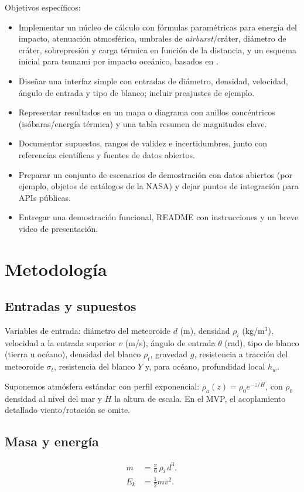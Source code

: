 \documentclass[conference]{IEEEtran}
\begin{document}
Objetivos específicos:
\begin{itemize}
    \item Implementar un núcleo de cálculo con fórmulas paramétricas para energía del impacto, atenuación atmosférica, umbrales de \textit{airburst}/cráter, diámetro de cráter, sobrepresión y carga térmica en función de la distancia, y un esquema inicial para tsunami por impacto oceánico, basados en \cite{collins2005,holsapple1993,wuennemann2010}.
    \item Diseñar una interfaz simple con entradas de diámetro, densidad, velocidad, ángulo de entrada y tipo de blanco; incluir preajustes de ejemplo.
    \item Representar resultados en un mapa o diagrama con anillos concéntricos (isóbaras/energía térmica) y una tabla resumen de magnitudes clave.
    \item Documentar supuestos, rangos de validez e incertidumbres, junto con referencias científicas y fuentes de datos abiertos.
    \item Preparar un conjunto de escenarios de demostración con datos abiertos (por ejemplo, objetos de catálogos de la NASA) y dejar puntos de integración para APIs públicas.
    \item Entregar una demostración funcional, README con instrucciones y un breve video de presentación.
\end{itemize}

\section{Metodología}

\subsection{Entradas y supuestos}
Variables de entrada: diámetro del meteoroide $d$ (m), densidad $\rho_i$ (kg/m$^3$), velocidad a la entrada superior $v$ (m/s), ángulo de entrada $\theta$ (rad), tipo de blanco (tierra u océano), densidad del blanco $\rho_t$, gravedad $g$, resistencia a tracción del meteoroide $\sigma_t$, resistencia del blanco $Y$ y, para océano, profundidad local $h_w$.

Suponemos atmósfera estándar con perfil exponencial: $\rho_a(z) = \rho_0 e^{-z/H}$, con $\rho_0$ densidad al nivel del mar y $H$ la altura de escala. En el MVP, el acoplamiento detallado viento/rotación se omite.

\subsection{Masa y energía}
\begin{align}
    m &= \frac{\pi}{6} \, \rho_i \, d^3, \\
    E_k &= \tfrac{1}{2} m v^2.
\end{align}
\end{document}
